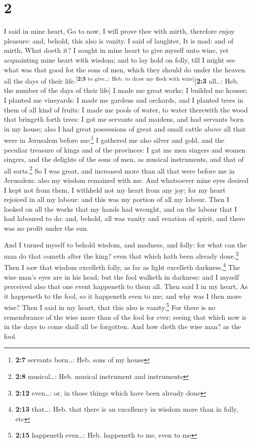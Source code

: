 \hypertarget{section-1}{%
\section{2}\label{section-1}}

 I said in mine heart, Go to now, I will prove thee with
mirth, therefore enjoy pleasure: and, behold, this also is vanity.
 I said of laughter, It is mad: and of mirth, What doeth
it?  I sought in mine heart to give myself unto wine, yet
acquainting mine heart with wisdom; and to lay hold on folly, till I
might see what was that good for the sons of men, which they should do
under the heaven all the days of their
life.\textsuperscript{{[}\textbf{2:3} to give\ldots: Heb. to draw my
flesh with wine{]}}{[}\textbf{2:3} all\ldots: Heb. the number of the
days of their life{]}  I made me great works; I builded me
houses; I planted me vineyards:  I made me gardens and
orchards, and I planted trees in them of all kind of fruits:
 I made me pools of water, to water therewith the wood
that bringeth forth trees:  I got me servants and maidens,
and had servants born in my house; also I had great possessions of great
and small cattle above all that were in Jerusalem before me:\footnote{\textbf{2:7}
  servants born\ldots: Heb. sons of my house}  I gathered
me also silver and gold, and the peculiar treasure of kings and of the
provinces: I gat me men singers and women singers, and the delights of
the sons of men, as musical instruments, and that of all
sorts.\footnote{\textbf{2:8} musical\ldots: Heb. musical instrument and
  instruments}  So I was great, and increased more than
all that were before me in Jerusalem: also my wisdom remained with me.
 And whatsoever mine eyes desired I kept not from them, I
withheld not my heart from any joy; for my heart rejoiced in all my
labour: and this was my portion of all my labour.  Then I
looked on all the works that my hands had wrought, and on the labour
that I had laboured to do: and, behold, all was vanity and vexation of
spirit, and there was no profit under the sun.

 And I turned myself to behold wisdom, and madness, and
folly: for what can the man do that cometh after the king? even that
which hath been already done.\footnote{\textbf{2:12} even\ldots: or, in
  those things which have been already done}  Then I saw
that wisdom excelleth folly, as far as light excelleth
darkness.\footnote{\textbf{2:13} that\ldots: Heb. that there is an
  excellency in wisdom more than in folly, etc}  The wise
man's eyes are in his head; but the fool walketh in darkness: and I
myself perceived also that one event happeneth to them all.
 Then said I in my heart, As it happeneth to the fool, so
it happeneth even to me; and why was I then more wise? Then I said in my
heart, that this also is vanity.\footnote{\textbf{2:15} happeneth
  even\ldots: Heb. happeneth to me, even to me}  For
there is no remembrance of the wise more than of the fool for ever;
seeing that which now is in the days to come shall all be forgotten. And
how dieth the wise man? as the fool.

